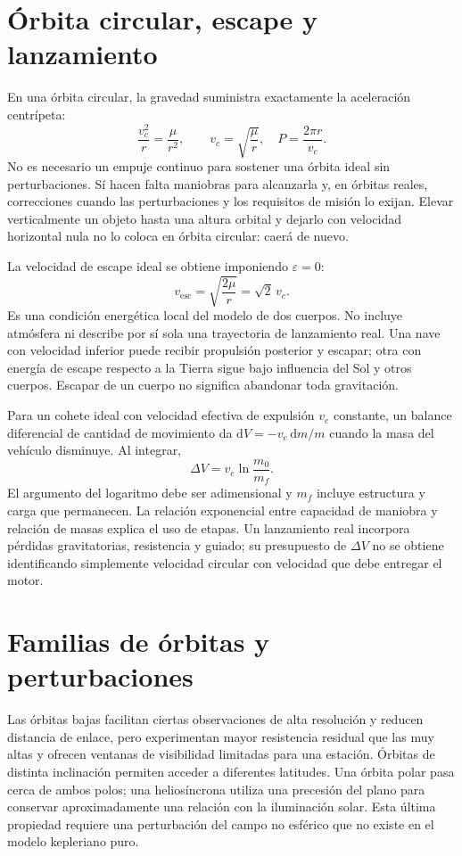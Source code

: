 \section{Órbita circular, escape y lanzamiento}
En una órbita circular, la gravedad suministra exactamente la aceleración centrípeta:
\begin{equation}\label{eq:15-circ}
\frac{v_c^2}{r}=\frac\mu{r^2},\qquad
v_c=\sqrt{\frac\mu r},\quad P=\frac{2\pi r}{v_c}.
\end{equation}
No es necesario un empuje continuo para sostener una órbita ideal sin perturbaciones. Sí hacen falta maniobras para alcanzarla y, en órbitas reales, correcciones cuando las perturbaciones y los requisitos de misión lo exijan. Elevar verticalmente un objeto hasta una altura orbital y dejarlo con velocidad horizontal nula no lo coloca en órbita circular: caerá de nuevo.

La velocidad de escape ideal se obtiene imponiendo $\varepsilon=0$:
\begin{equation}
v_{\mathrm{esc}}=\sqrt{\frac{2\mu}{r}}=\sqrt2\,v_c.
\end{equation}
Es una condición energética local del modelo de dos cuerpos. No incluye atmósfera ni describe por sí sola una trayectoria de lanzamiento real. Una nave con velocidad inferior puede recibir propulsión posterior y escapar; otra con energía de escape respecto a la Tierra sigue bajo influencia del Sol y otros cuerpos. Escapar de un cuerpo no significa abandonar toda gravitación.

Para un cohete ideal con velocidad efectiva de expulsión $v_e$ constante, un balance diferencial de cantidad de movimiento da $\mathrm dV=-v_e\,\mathrm dm/m$ cuando la masa del vehículo disminuye. Al integrar,
\begin{equation}
\Delta V=v_e\ln\frac{m_0}{m_f}.
\end{equation}
El argumento del logaritmo debe ser adimensional y $m_f$ incluye estructura y carga que permanecen. La relación exponencial entre capacidad de maniobra y relación de masas explica el uso de etapas. Un lanzamiento real incorpora pérdidas gravitatorias, resistencia y guiado; su presupuesto de $\Delta V$ no se obtiene identificando simplemente velocidad circular con velocidad que debe entregar el motor.

\section{Familias de órbitas y perturbaciones}
Las órbitas bajas facilitan ciertas observaciones de alta resolución y reducen distancia de enlace, pero experimentan mayor resistencia residual que las muy altas y ofrecen ventanas de visibilidad limitadas para una estación. Órbitas de distinta inclinación permiten acceder a diferentes latitudes. Una órbita polar pasa cerca de ambos polos; una heliosíncrona utiliza una precesión del plano para conservar aproximadamente una relación con la iluminación solar. Esta última propiedad requiere una perturbación del campo no esférico que no existe en el modelo kepleriano puro.

